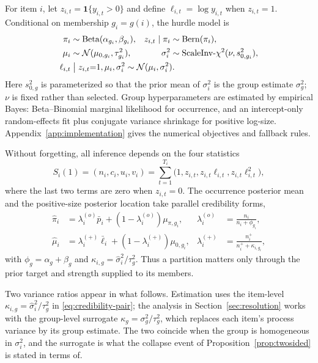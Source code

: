 \documentclass[twoside]{article}
\theoremstyle{definition}
\newcommand{\ind}[1]{\mathbf{1}\{#1\}}
\begin{document}
For item $i$, let $z_{i,t}=\ind{y_{i,t}>0}$ and define
$\ell_{i,t}=\log y_{i,t}$ when $z_{i,t}=1$. Conditional on membership
$g_i=g(i)$, the hurdle model is
\begin{equation}
\begin{aligned}
\pi_i &\sim \mathrm{Beta}(\alpha_{g_i},\beta_{g_i}), &
z_{i,t}\mid\pi_i &\sim \mathrm{Bern}(\pi_i),\\
\mu_i &\sim \mathcal{N}(\mu_{0,g_i},\tau^2_{g_i}), &
\sigma_i^2 &\sim \mathrm{ScaleInv}\text{-}\chi^2(\nu,s^2_{0,g_i}),\\
\ell_{i,t} &\;\big|\; z_{i,t}{=}1,\mu_i,\sigma_i^2
\sim \mathcal{N}(\mu_i,\sigma_i^2).\span\span
\end{aligned}
\label{eq:model}
\end{equation}
Here $s^2_{0,g}$ is parameterized so that the prior mean of
$\sigma_i^2$ is the group estimate $\sigma_g^2$; $\nu$ is fixed rather
than selected. Group hyperparameters are estimated by empirical Bayes:
Beta--Binomial marginal likelihood for occurrence, and an
intercept-only random-effects fit plus conjugate variance shrinkage for
positive log-size. Appendix~\ref{app:implementation} gives the numerical
objectives and fallback rules.

Without forgetting, all inference depends on the four statistics
\[
S_i(1)=(n_i,c_i,u_i,v_i)
=\sum_{t=1}^{T_i}
  \bigl(1,z_{i,t},z_{i,t}\ell_{i,t},z_{i,t}\ell_{i,t}^2\bigr),
\]
where the last two terms are zero when $z_{i,t}=0$. The occurrence
posterior mean and the positive-size posterior location take parallel
credibility forms,
\begin{align}
\hat\pi_i
&=\lambda_i^{(o)}\bar p_i+(1-\lambda_i^{(o)})\mu_{\pi,g_i},
&\lambda_i^{(o)}&=\frac{n_i}{n_i+\phi_{g_i}},\nonumber\\
\hat\mu_i
&=\lambda_i^{(+)}\bar\ell_i+(1-\lambda_i^{(+)})\mu_{0,g_i},
&\lambda_i^{(+)}&=\frac{n_i^+}{n_i^++\kappa_{i,g_i}},
\label{eq:credibility-pair}
\end{align}
with $\phi_g=\alpha_g+\beta_g$ and
$\kappa_{i,g}=\hat\sigma_i^2/\tau_g^2$. Thus a partition matters only
through the prior target and strength supplied to its members.

Two variance ratios appear in what follows. Estimation uses the item-level
$\kappa_{i,g}=\hat\sigma_i^2/\tau_g^2$ in
\eqref{eq:credibility-pair}; the analysis in
Section~\ref{sec:resolution} works with the group-level surrogate
$\kappa_g=\sigma_g^2/\tau_g^2$, which replaces each item's process
variance by its group estimate. The two coincide when the group is
homogeneous in $\sigma_i^2$, and the surrogate is what the collapse event
of Proposition~\ref{prop:twosided} is stated in terms of.
\end{document}
